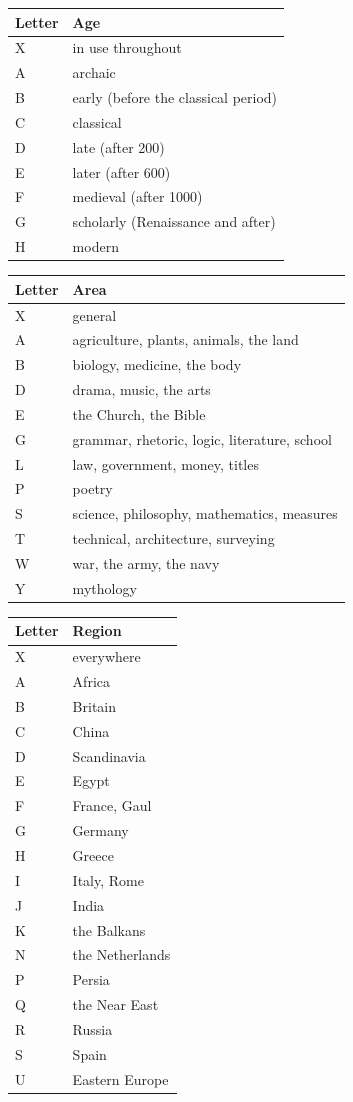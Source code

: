 \documentclass[12pt,
              article,
              oneside
              ]{memoir}
\begin{document}
\begin{longtable}{@{}lp{}@{}}
\toprule
Letter & Age\\
\midrule
\endhead
X & in use throughout\\
A & archaic\\
B & early (before the classical period)\\
C & classical\\
D & late (after 200)\\
E & later (after 600)\\
F & medieval (after 1000)\\
G & scholarly (Renaissance and after)\\
H & modern\\
\bottomrule
\end{longtable}

\begin{longtable}{@{}lp{}@{}}
\toprule
Letter & Area\\
\midrule
\endhead
X & general\\
A & agriculture, plants, animals, the land\\
B & biology, medicine, the body\\
D & drama, music, the arts\\
E & the Church, the Bible\\
G & grammar, rhetoric, logic, literature, school\\
L & law, government, money, titles\\
P & poetry\\
S & science, philosophy, mathematics, measures\\
T & technical, architecture, surveying\\
W & war, the army, the navy\\
Y & mythology\\
\bottomrule
\end{longtable}

\begin{longtable}{@{}lp{}@{}}
\toprule
Letter & Region\\
\midrule
\endhead
X & everywhere\\
A & Africa\\
B & Britain\\
C & China\\
D & Scandinavia\\
E & Egypt\\
F & France, Gaul\\
G & Germany\\
H & Greece\\
I & Italy, Rome\\
J & India\\
K & the Balkans\\
N & the Netherlands\\
P & Persia\\
Q & the Near East\\
R & Russia\\
S & Spain\\
U & Eastern Europe\\
\bottomrule
\end{longtable}
\end{document}
